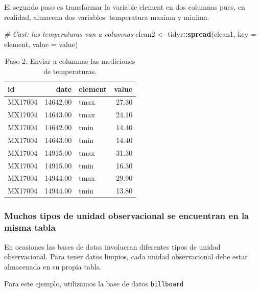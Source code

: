 \documentclass[]{article}
\newenvironment{Shaded}{\begin{snugshade}}{\end{snugshade}}
\newcommand{\KeywordTok}[1]{\textcolor[rgb]{0.13,0.29,0.53}{\textbf{#1}}}
\newcommand{\DataTypeTok}[1]{\textcolor[rgb]{0.13,0.29,0.53}{#1}}
\newcommand{\StringTok}[1]{\textcolor[rgb]{0.31,0.60,0.02}{#1}}
\newcommand{\CommentTok}[1]{\textcolor[rgb]{0.56,0.35,0.01}{\textit{#1}}}
\newcommand{\OperatorTok}[1]{\textcolor[rgb]{0.81,0.36,0.00}{\textbf{#1}}}
\newcommand{\NormalTok}[1]{#1}
\begin{document}
El segundo paso es transformar la variable element en dos columnas pues,
en realidad, almacena dos variables: temperatura maxima y minima.

\begin{Shaded}
\begin{Highlighting}[]
\CommentTok{# Cast: las temperaturas van a columnas}
\NormalTok{clean2 <-}\StringTok{ }\NormalTok{tidyr}\OperatorTok{::}\KeywordTok{spread}\NormalTok{(clean1, }\DataTypeTok{key =}\NormalTok{ element, }\DataTypeTok{value =}\NormalTok{ value)}
\end{Highlighting}
\end{Shaded}

\begin{table}[ht]
\centering
\begin{tabular}{lrlr}
  \hline
id & date & element & value \\ 
  \hline
MX17004 & 14642.00 & tmax & 27.30 \\ 
  MX17004 & 14643.00 & tmax & 24.10 \\ 
  MX17004 & 14642.00 & tmin & 14.40 \\ 
  MX17004 & 14643.00 & tmin & 14.40 \\ 
  MX17004 & 14915.00 & tmax & 31.30 \\ 
  MX17004 & 14915.00 & tmin & 16.30 \\ 
  MX17004 & 14944.00 & tmax & 29.90 \\ 
  MX17004 & 14944.00 & tmin & 13.80 \\ 
   \hline
\end{tabular}
\caption{Paso 2. Enviar a columnas las mediciones de temperaturas.} 
\label{tab:clima1}
\end{table}

\subsubsection{Muchos tipos de unidad observacional se encuentran en la
misma
tabla}\label{muchos-tipos-de-unidad-observacional-se-encuentran-en-la-misma-tabla}

En ocasiones las bases de datos involucran diferentes tipos de unidad
observacional. Para tener datos limpios, cada unidad observacional debe
estar almacenada en su propia tabla.

Para este ejemplo, utilizamos la base de datos \texttt{billboard}
\parencite[][archivo: data/billboard.csv]{tidydata}
\end{document}

